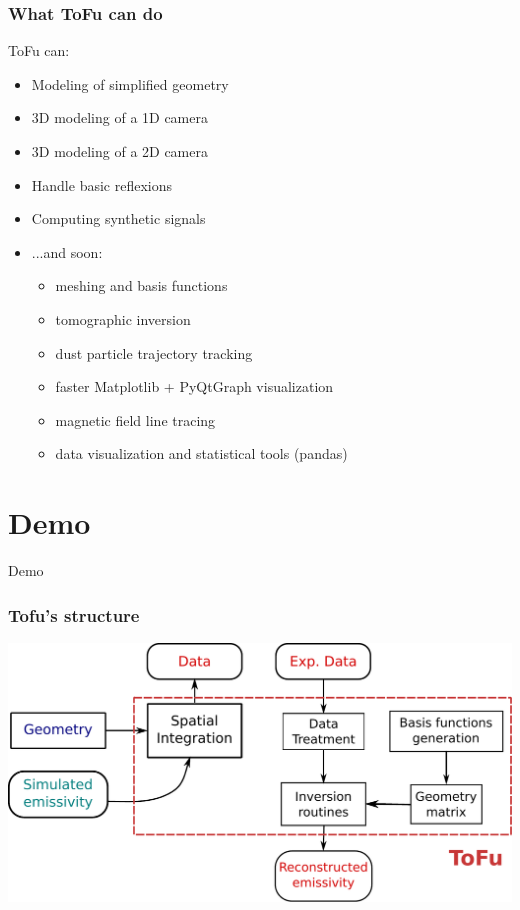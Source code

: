 \documentclass[10pt]{beamer}
\begin{document}
\begin{frame}
\frametitle{What ToFu can do}
ToFu can:
\begin{itemize}
	\item Modeling of simplified geometry
	\item 3D modeling of a 1D camera
	\item 3D modeling of a 2D camera
	\item Handle basic reflexions
	\item Computing synthetic signals
	\item ...and soon:
		\begin{itemize}
			\item meshing and basis functions
			\item tomographic inversion
			\item dust particle trajectory tracking
			\item faster Matplotlib + PyQtGraph visualization
			\item magnetic field line tracing
			\item data visualization and statistical tools (pandas)
		\end{itemize}
\end{itemize}
\end{frame}
\section{Demo}

{
\begin{frame}[standout]
  Demo
\end{frame}
}

\begin{frame}
\frametitle{Tofu's structure}

\begin{center}
    	\includegraphics[width=0.8\linewidth]{figures/tofu.pdf}
\end{center}
	
\end{frame}
\end{document}
